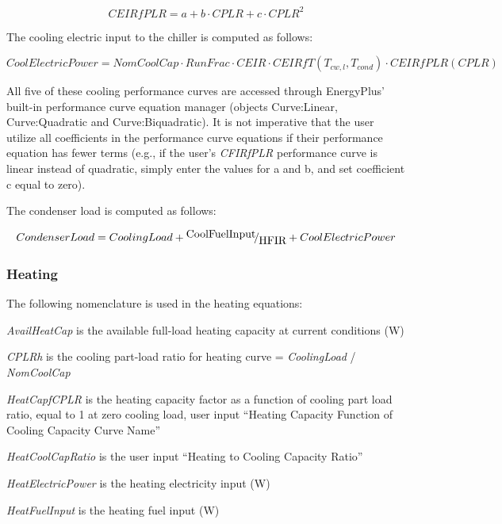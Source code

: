 \begin{equation}
CEIRfPLR = a + b \cdot CPLR + c \cdot CPL{R^2}
\end{equation}

The cooling electric input to the chiller is computed as follows:

\begin{equation}
CoolElectricPower = NomCoolCap \cdot RunFrac \cdot CEIR \cdot CEIRfT({T_{cw,l}},{T_{cond}}) \cdot CEIRfPLR(CPLR)
\end{equation}

All five of these cooling performance curves are accessed through EnergyPlus' built-in performance curve equation manager (objects Curve:Linear, Curve:Quadratic and Curve:Biquadratic). It is not imperative that the user utilize all coefficients in the performance curve equations if their performance equation has fewer terms (e.g., if the user's \emph{CFIRfPLR} performance curve is linear instead of quadratic, simply enter the values for a and b, and set coefficient c equal to zero).

The condenser load is computed as follows:

\begin{equation}
CondenserLoad = CoolingLoad + {\raise0.7ex\hbox{{CoolFuelInput}} \!\mathord{\left/ {\vphantom {{CoolFuelInput} {HFIR}}}\right.}\!\lower0.7ex\hbox{{HFIR}}} + CoolElectricPower
\end{equation}

\subsubsection{Heating}\label{heating}

The following nomenclature is used in the heating equations:

\emph{AvailHeatCap} is the available full-load heating capacity at current conditions (W)

\emph{CPLRh} is the cooling part-load ratio for heating curve = \emph{CoolingLoad} / \emph{NomCoolCap}

\emph{HeatCapfCPLR} is the heating capacity factor as a function of cooling part load ratio, equal to 1 at zero cooling load, user input ``Heating Capacity Function of Cooling Capacity Curve Name''

\emph{HeatCoolCapRatio} is the user input ``Heating to Cooling Capacity Ratio''

\emph{HeatElectricPower} is the heating electricity input (W)

\emph{HeatFuelInput} is the heating fuel input (W)

